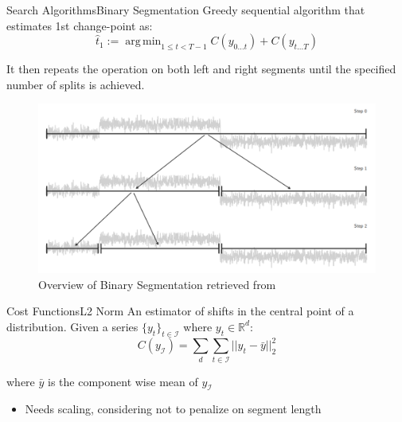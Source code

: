 \documentclass{beamer}
\DeclareMathOperator*{\argmin}{arg\,min}
\begin{document}
            \begin{frame}{Search Algorithms}{Binary Segmentation}
                Greedy sequential algorithm that estimates 1st change-point as:
                \begin{equation}
                    \hat{t}_{1} := \argmin_{1 \leq t < T - 1} C(y_{0 \dots t}) + C(y_{t \dots T})
                \end{equation}

                It then repeats the operation on both left and right segments until the specified number of splits is achieved.

                \begin{figure}[!htbp]
                    \centering
                    \includegraphics[scale=0.3]{bin_seg_schematics.png}
                    \caption{Overview of Binary Segmentation retrieved from \cite{truong2020selective}}
                \end{figure}
            \end{frame}

            \begin{frame}{Cost Functions}{L2 Norm}
                An estimator of shifts in the central point of a distribution. Given a series $\{y_t\}_{t \in \mathcal{I}}$ where  $y_t \in \mathbb{R}^d$:
                \begin{equation}
                    C(y_{\mathcal{I}}) = \sum_{d} \sum_{t \in \mathcal{I}} ||y_t - \bar{y} ||_{2}^{2}
                \end{equation}

                where $\bar{y}$ is the component wise mean of $y_{\mathcal{I}}$

                \begin{itemize}
                    \item Needs scaling, considering not to penalize on segment length
                \end{itemize}

            \end{frame}
\end{document}
